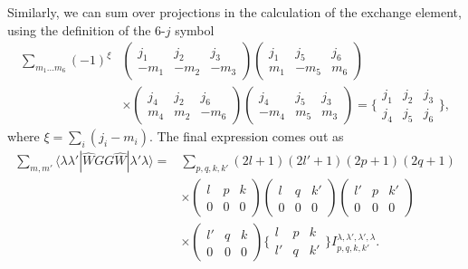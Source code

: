  Similarly, we can sum over projections in the calculation of the exchange element, using the definition of the 6-$j$ symbol~\cite{cowan1981theory}
\begin{align}
   \sum_{m_1...m_6}(-1)^\xi&\left(\begin{matrix}j_1&j_2&j_3\\-m_1&-m_2&-m_3\end{matrix}\right)\left(\begin{matrix}j_1&j_5&j_6\\m_1&-m_5&m_6\end{matrix}\right) \nonumber\\
   &\times\left(\begin{matrix}j_4&j_2&j_6\\m_4&m_2&-m_6\end{matrix}\right)\left(\begin{matrix}j_4&j_5&j_3\\-m_4&m_5&m_3\end{matrix}\right) =  \bigg\{\begin{matrix}j_1&j_2&j_3\\j_4&j_5&j_6\end{matrix}\bigg\},
\end{align}
where $\xi = \sum_i (j_i-m_i)$. The final expression comes out as
\begin{align}
    \sum_{m,m'}\langle \lambda \lambda'|\widehat{W} GG \widehat{W}|\lambda' \lambda\rangle =& \sum_{p,q,k,k'} (2l+1)(2l'+1)(2p+1)(2q+1) \nonumber\\
    &\times\left(\begin{matrix}l&p&k\\0&0&0\end{matrix}\right)\left(\begin{matrix}l&q&k'\\0&0&0\end{matrix}\right)\left(\begin{matrix}l'&p&k'\\0&0&0\end{matrix}\right) \nonumber
    \\
    &\times\left(\begin{matrix}l'&q&k\\0&0&0\end{matrix}\right)\bigg\{\begin{matrix}l&p&k\\l'&q&k'\end{matrix}\bigg\}I^{\lambda,\lambda',\lambda',\lambda}_{p,q,k,k'}.
\end{align}

